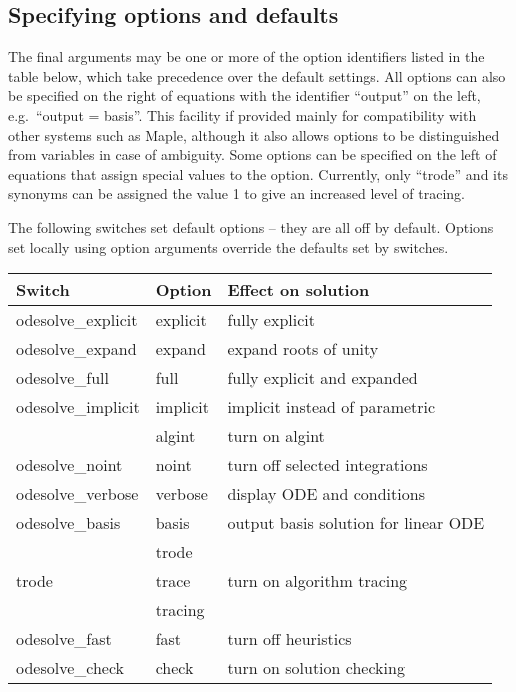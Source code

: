 \documentclass[a4paper]{article} %
\begin{document}
\subsection{Specifying options and defaults}

The final arguments may be one or more of the option identifiers
listed in the table below, which take precedence over the default
settings.  All options can also be specified on the right of equations
with the identifier ``output'' on the left, e.g.\ ``output = basis''.
This facility if provided mainly for compatibility with other systems
such as Maple, although it also allows options to be distinguished
from variables in case of ambiguity.  Some options can be specified on
the left of equations that assign special values to the option.
Currently, only ``trode'' and its synonyms can be assigned the value 1
to give an increased level of tracing.

The following switches set default options -- they are all off by
default.  Options set locally using option arguments override the
defaults set by switches.
\begin{center}
\begin{tabular}{lll}
\bf Switch         & \bf Option  & \bf Effect on solution \\
\hline
odesolve\_explicit & explicit    & fully explicit \\
odesolve\_expand   & expand      & expand roots of unity \\
odesolve\_full     & full        & fully explicit and expanded \\
odesolve\_implicit & implicit    & implicit instead of parametric \\
                   & algint      & turn on algint \\
odesolve\_noint    & noint       & turn off selected integrations \\
odesolve\_verbose  & verbose     & display ODE and conditions \\
odesolve\_basis    & basis       & output basis solution for linear ODE \\
                   & trode \\
trode              & trace       & turn on algorithm tracing \\
                   & tracing \\
odesolve\_fast     & fast        & turn off heuristics \\
odesolve\_check    & check       & turn on solution checking
\end{tabular}
\end{center}
\end{document}
